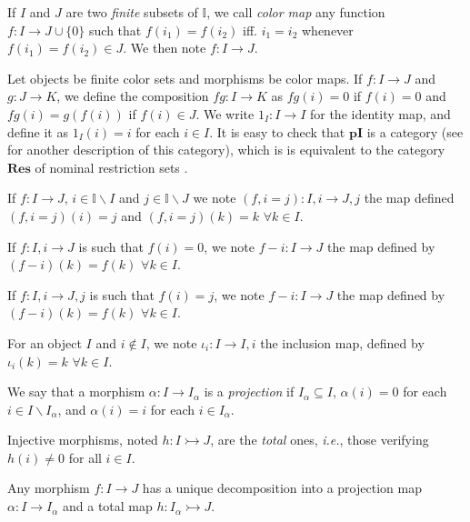 \documentclass[english]{PaperTools/latex/lipics}
\def\pI{\ensuremath{\mathbf{pI}}}
\def\ie{\textit{i.e.}}
\begin{document}
\begin{definition}
  If $I$ and $J$ are two \emph{finite} subsets of $𝕀$, we call
  \emph{color map} any function $f : I → J ∪ \{0\}$ such that
  $f(i_1) = f(i_2)$ iff. $i_1 = i_2$ whenever $f(i_1) = f(i_2) ∈ J$.
  We then note $f : I → J$.
\end{definition}

\begin{definition}[Category $\pI{}$]
  \label{def:pI}
  Let objects be finite color sets and morphisms be color maps.
  If $f : I → J$ and $g : J → K$, we define the composition $fg : I → K$
  as $fg(i) = 0$ if $f(i) = 0$ and $fg(i) = g(f(i))$ if $f(i) ∈ J$.
  We write $1_I : I → I$ for the identity map, and define it as $1_I(i) = i$ for each $i ∈ I$.
  It is easy to check that \pI{} is a category (see \cite[ex.~9.7
  p.~176]{PittsAM:nomsns} for another description of this category),
  which is is equivalent to the category $\mathbf{Res}$ of nominal
  restriction sets \cite[rem.~9.9 p.~161]{PittsAM:nomsns}.
\end{definition}

If $f : I → J$, $i ∈ 𝕀 \backslash I$ and $j ∈ 𝕀 \backslash J$ we note
$(f, i = j) : I,i → J,j$ the map defined $(f,i=j)(i) = j$ and
$(f,i=j)(k) = k$ $∀ k ∈ I$.

If $f : I,i → J$ is such that $f(i) = 0$, we note $f-i : I → J$ the map
defined by $(f-i)(k) = f(k)$ $∀ k ∈ I$.

If $f : I,i → J,j$ is such that $f(i) = j$, we note $f-i : I → J$ the map
defined by $(f-i)(k) = f(k)$ $∀ k ∈ I$.

For an object $I$ and $i ∉ I$, we note $ι_i : I → I,i$ the inclusion
map, defined by $ι_i(k) = k$ $∀ k ∈ I$.

\begin{definition}[Projection]
   We say that a morphism $α : I → I_α$ is a \emph{projection} if
   $I_α ⊆ I$,
   $α(i) = 0$ for each $i ∈ I \backslash I_α$, and
   $α(i) = i$ for each $i ∈ I_α$.
\end{definition}
\begin{definition}
  Injective morphisms, noted $h : I ↣ J$, are the \emph{total} ones, \ie,
  those verifying $h(i) ≠ 0$ for all $i ∈ I$.
\end{definition}
\begin{remark}
  Any morphism $f : I → J$ has a
  unique decomposition into a projection map
  $α : I → I_α$ and a total map $h : I_α ↣ J$.
\end{remark}
\end{document}
